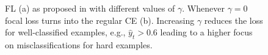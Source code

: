 \begin{figure}[H]%
    \centering
    \caption[Graph of \acf{CE} and \acf{FL}]{\ac{FL} (a) as proposed in \cite{lin2017focal} with different values of $\gamma$. Whenever $\gamma=0$ focal loss turns into the regular \ac{CE} (b). Increasing $\gamma$ reduces the loss for well-classified examples, e.g., $\hat{y}_t > 0.6$ leading to a higher focus on misclassifications for hard examples.}
    \label{focal_loss_plot}
\end{figure}

